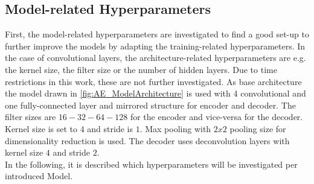 \documentclass[12pt,DIV14,BCOR12mm,a4paper,footexclude,headinclude,halfparskip-,twoside,openright,cleardoubleempty,idxtotoc,bibtotoc,listtotoc,abstracton]{scrreprt} %
\numberwithin{equation}{chapter}
\begin{document}
\subsection{Model-related Hyperparameters}\label{subsec:Model-related Hyperparameters}
First, the model-related hyperparameters are investigated to find a good set-up to further improve the models by adapting the training-related hyperparameters. In the case of convolutional layers, the architecture-related hyperparameters are e.g. the kernel size, the filter size or the number of hidden layers. Due to time restrictions in this work, these are not further investigated. As base architecture the model drawn in \ref{fig:AE_ModelArchitecture} is used with 4 convolutional and one fully-connected layer and mirrored structure for encoder and decoder. The filter sizes are $16-32-64-128$ for the encoder and vice-versa for the decoder. Kernel size is set to $4$ and stride is $1$. Max pooling with $2x2$ pooling size for dimensionality reduction is used. The decoder uses deconvolution layers with kernel size $4$ and stride $2$.\\
In the following, it is described which hyperparameters will be investigated per introduced Model.
\end{document}
